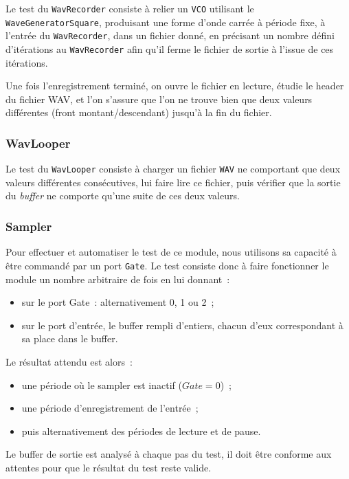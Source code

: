 Le test du \verb!WavRecorder! consiste à relier un \verb!VCO!
utilisant le \verb!WaveGeneratorSquare!, produisant une forme
d'onde carrée à période fixe, à l'entrée du \verb!WavRecorder!,
dans un fichier donné, en précisant un nombre défini d'itérations
au \verb!WavRecorder! afin qu'il ferme le fichier de sortie à l’issue
de ces itérations.

Une fois l'enregistrement terminé, on ouvre le fichier en lecture,
étudie le header du fichier WAV, et l'on s'assure que l'on
ne trouve bien que deux valeurs différentes (front
montant/descendant) jusqu'à la fin du fichier.

\subsubsection{WavLooper}

Le test du \verb!WavLooper! consiste à charger un fichier
\verb!WAV! ne comportant que deux valeurs différentes consécutives, lui faire
lire ce fichier, puis vérifier que la sortie du \emph{buffer} ne
comporte qu'une suite de ces deux valeurs.

\subsubsection{Sampler}
Pour effectuer et automatiser le test de ce module, nous utilisons sa capacité à être commandé par un port \texttt{Gate}. Le test consiste donc à faire fonctionner le module un nombre arbitraire de fois en lui donnant~: 
\begin{itemize}
    \item sur le port Gate~: alternativement 0, 1 ou 2~;
    \item sur le port d'entrée, le buffer rempli d'entiers, chacun d'eux correspondant à sa place dans le buffer.
\end{itemize}
Le résultat attendu est alors~:
\begin{itemize}
    \item une période où le sampler est inactif ($Gate=0$)~;
    \item une période d'enregistrement de l'entrée~;
    \item puis alternativement des périodes de lecture et de pause.
\end{itemize}

Le buffer de sortie est analysé à chaque pas du test, il doit être conforme aux attentes pour que le résultat du test reste valide.
